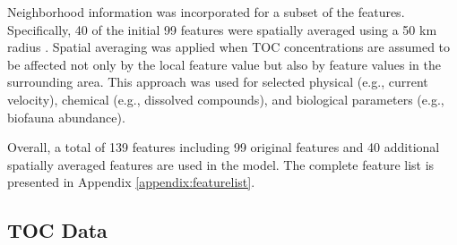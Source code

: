 \documentclass[journal abbreviation, manuscript]{copernicus}
\begin{document}
Neighborhood information was incorporated for a subset of the features. Specifically, 40 of the initial 99 features were spatially averaged using a 50 km radius \citep{LeeTOCkNN}. Spatial averaging was applied when TOC concentrations are assumed to be affected not only by the local feature value but also by feature values  in the surrounding area.  This approach was used for selected physical (e.g., current velocity), chemical (e.g., dissolved compounds), and biological parameters (e.g., biofauna abundance). 

Overall, a total of 139 features including 99 original features and 40 additional spatially averaged features are used in the model. The complete feature list is presented in Appendix \ref{appendix:featurelist}.



\subsection{TOC Data}
\label{subsec: labels}
\end{document}
